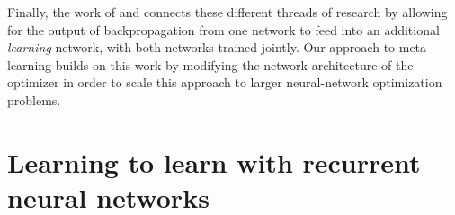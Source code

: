 \documentclass{article}
\begin{document}
Finally, the work of \cite{younger:2001} and \cite{hochreiter:2001} connects
these different threads of research by allowing for the output of
backpropagation from one network to feed into an additional \emph{learning}
network, with both networks trained jointly. Our approach to meta-learning
builds on this work by modifying the network architecture of the optimizer in
order to scale this approach to larger neural-network optimization problems.




\section{Learning to learn with recurrent neural networks}
\label{sec:learning-to-learn}

\end{document}
